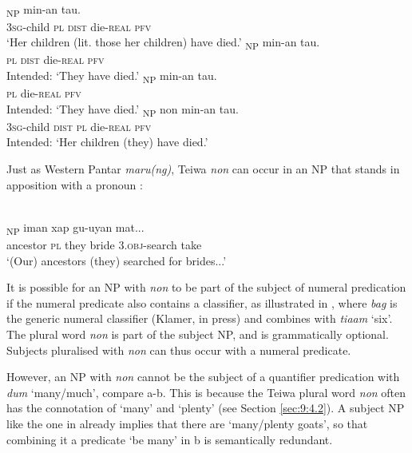 \ea%
\label{ex:9:25}
 \\
\ea
{}\textsubscript{NP} min-an tau. \\
   \textsc{3sg}-child \textsc{pl} \textsc{dist} die-\textsc{real} \textsc{pfv} \\
\glt `Her children (lit. those her children) have died.'
\ex
\gll *[Non u]\textsubscript{NP} min-an tau. \\
   \textsc{pl} \textsc{dist} die-\textsc{real} \textsc{pfv} \\
\glt  Intended: `They have died.'
\ex
\gll *[{Non}]\textsubscript{NP} min-an tau. \\
    \textsc{pl} die-\textsc{real} \textsc{pfv} \\
\glt  Intended: `They have died.'
\ex
\gll *[{G-oqai}   {u}]\textsubscript{NP} non min-an tau. \\
  \textsc{3sg}-child \textsc{dist} \textsc{pl} die-\textsc{real} \textsc{pfv}  \\
\glt  Intended: `Her children (they) have died.'
\z
\z






Just as Western Pantar \textit{maru(ng)}, Teiwa \textit{non} can occur in an NP that stands in apposition with a pronoun :


\ea%
\label{ex:9:26}
 \\
\textsubscript{NP} iman xap gu-uyan mat... \\
  ancestor \textsc{pl} they bride  3.\textsc{obj-}search take  \\
\glt `(Our) ancestors (they) searched for brides...'
\z






It is possible for an NP with \textit{non} to be part of the subject of numeral predication if the numeral predicate also contains a classifier, as illustrated in , where \textit{bag} is the generic numeral classifier (Klamer, in press) and combines with \textit{tiaam} `six'. The plural word \textit{non} is part of the subject NP, and is grammatically optional. Subjects pluralised with \textit{non} can thus occur with a numeral predicate.

However, an NP with \textit{non} cannot be the subject of a quantifier predication with \textit{dum} `many/much', compare a-b. This is because the Teiwa plural word \textit{non} often has the connotation of `many' and `plenty' (see Section \ref{sec:9:4.2}). A subject NP like the one in  already implies that there are `many/plenty goats', so that combining it a predicate `be many' in b is semantically redundant.


